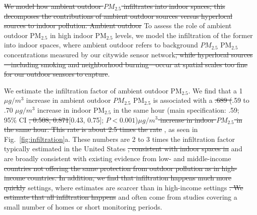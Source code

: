 \documentclass[reqno,12pt,notitlepage]{article}
\providecommand{\DIFadd}[1]{{\protect\color{BLUE}#1}} %
\providecommand{\DIFdel}[1]{{\protect\color{red}\sout{#1}}} %
\providecommand{\DIFaddbegin}{} %
\providecommand{\DIFaddend}{} %
\providecommand{\DIFdelbegin}{} %
\providecommand{\DIFdelend}{} %
\begin{document}
\DIFdelbegin \DIFdel{We model how ambient outdoor $PM_{2.5}$ infiltrates into indoor spaces; this decomposes the contributions of ambient outdoor sources versus hyperlocal sources to indoor pollution. Ambient outdoor }\DIFdelend \DIFaddbegin \DIFadd{To assess the role of ambient outdoor PM$_{2.5}$ in high indoor PM$_{2.5}$ levels, we model the infiltration of the former into indoor spaces, where ambient outdoor }\DIFaddend refers to background \DIFdelbegin \DIFdel{$PM_{2.5}$ }\DIFdelend \DIFaddbegin \DIFadd{PM$_{2.5}$ }\DIFaddend concentrations measured by our citywide sensor network\DIFdelbegin \DIFdel{, while hyperlocal sources---including smoking and neighborhood burning---occur at spatial scales too fine for our outdoor sensors to capture}\DIFdelend .

We estimate \DIFaddbegin \DIFadd{the infiltration factor of ambient outdoor PM$_{2.5}$.
We find }\DIFaddend that a 1 $\mu g /m^{3}$ increase in ambient outdoor \DIFdelbegin \DIFdel{$PM_{2.5}$ }\DIFdelend \DIFaddbegin \DIFadd{PM$_{2.5}$ }\DIFaddend is associated with a \DIFdelbegin \DIFdel{.689 (}\DIFdelend \DIFaddbegin \DIFadd{.59 to .70 $\mu g/m^3$ increase in indoor PM$_{2.5}$ in the same hour (main specification: .59; }\DIFaddend 95\% CI \DIFdelbegin \DIFdel{, 0.508, 0.871}\DIFdelend \DIFaddbegin \DIFadd{[0.43, 0.75]}\DIFaddend ; $P < 0.001$)\DIFdelbegin \DIFdel{$\mu g /m^{3}$ increase in indoor $PM_{2.5}$ in the same hour. This rate is about 2.5 times the rate }\DIFdelend \DIFaddbegin \DIFadd{, as seen in Fig.\ \ref{fig:infiltration}a. 
These numbers are 2 to 3 times the infiltration factor }\DIFaddend typically estimated in the United States \DIFdelbegin \DIFdel{\citep{lunderberg_assessing_2023}, consistent with indoor spaces in }\DIFdelend \DIFaddbegin \DIFadd{\citep{burke_exposures_2022, lunderberg_assessing_2023} and are broadly consistent with existing evidence from }\DIFaddend low- and middle-income \DIFdelbegin \DIFdel{countries not offering the same protection from outdoor pollution as in high-income countries. In addition, we find that infiltration happens much more quickly }\DIFdelend \DIFaddbegin \DIFadd{settings, where estimates are scarcer }\DIFaddend than in high-income settings \DIFdelbegin \DIFdel{. We estimate that all infiltration happens }\DIFdelend \DIFaddbegin \DIFadd{and often come from studies covering a small number of homes or short monitoring periods.
}
\end{document}
